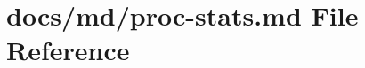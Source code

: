\hypertarget{proc-stats_8md}{}\section{docs/md/proc-\/stats.md File Reference}
\label{proc-stats_8md}
